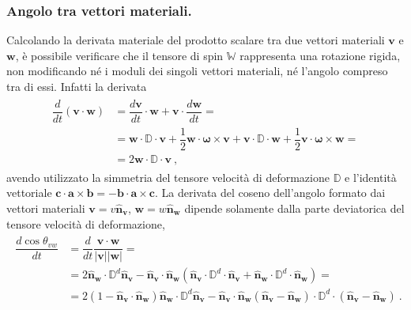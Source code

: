 \documentclass[letterpaper,10pt,italian]{jupyterBook}
\begin{document}
\subsubsection{Angolo tra vettori materiali.}
\label{\detokenize{polimi/fluidmechanics-ita/template/capitoli/03_cinematica/12teoria:angolo-tra-vettori-materiali}}
\sphinxAtStartPar
Calcolando la derivata materiale del prodotto scalare tra due vettori
materiali \(\mathbf{v}\) e \(\mathbf{w}\), è possibile verificare che il tensore di
spin \(\mathbb{W}\) rappresenta una rotazione rigida, non modificando né i
moduli dei singoli vettori materiali, né l’angolo compreso tra di essi.
Infatti la derivata
\begin{equation*}
\begin{split}\begin{aligned}
 \dfrac{d}{dt} (\mathbf{v} \cdot \mathbf{w}) & = \dfrac{d\mathbf{v}}{dt} \cdot \mathbf{w} + \mathbf{v} \cdot \dfrac{d\mathbf{w}}{dt} = \\
  & = \mathbf{w} \cdot \mathbb{D} \cdot \mathbf{v} + \dfrac{1}{2} \mathbf{w} \cdot \mathbf{\omega} \times \mathbf{v} + 
   \mathbf{v} \cdot \mathbb{D} \cdot \mathbf{w} + \dfrac{1}{2} \mathbf{v} \cdot \mathbf{\omega} \times \mathbf{w} = \\
   & = 2 \mathbf{w} \cdot \mathbb{D} \cdot \mathbf{v} \ ,
\end{aligned}\end{split}
\end{equation*}
\sphinxAtStartPar
avendo utilizzato la simmetria del tensore velocità di
deformazione \(\mathbb{D}\) e l’identità vettoriale
\(\mathbf{c} \cdot \mathbf{a} \times \mathbf{b} = - \mathbf{b} \cdot \mathbf{a} \times \mathbf{c}\).
La derivata del coseno dell’angolo formato dai vettori materiali
\(\mathbf{v} = v \mathbf{\hat{n}_v}\), \(\mathbf{w} = w \mathbf{\hat{n}_w}\) dipende
solamente dalla parte deviatorica del tensore velocità di deformazione,
\begin{equation*}
\begin{split}\begin{aligned}
 \dfrac{d \cos \theta_{vw}}{dt} & = \dfrac{d}{d t} \dfrac{\mathbf{v} \cdot \mathbf{w}}{|\mathbf{v}||\mathbf{w}|} = \\
  & = 2 \mathbf{\hat{n}_w} \cdot \mathbb{D}^d \mathbf{\hat{n}_v} - \mathbf{\hat{n}_v} \cdot \mathbf{\hat{n}_w} (\mathbf{\hat{n}_v} \cdot \mathbb{D}^d \cdot \mathbf{\hat{n}_v} + \mathbf{\hat{n}_w} \cdot \mathbb{D}^d \cdot \mathbf{\hat{n}_w} ) = \\
  & = 2 (1 - \mathbf{\hat{n}_v} \cdot \mathbf{\hat{n}_w}) \mathbf{\hat{n}_w} \cdot \mathbb{D}^d \mathbf{\hat{n}_v} - \mathbf{\hat{n}_v} \cdot \mathbf{\hat{n}_w} (\mathbf{\hat{n}_v} - \mathbf{\hat{n}_w}) \cdot \mathbb{D}^d \cdot (\mathbf{\hat{n}_v} - \mathbf{\hat{n}_w}) \ .
\end{aligned}\end{split}
\end{equation*}
\end{document}
